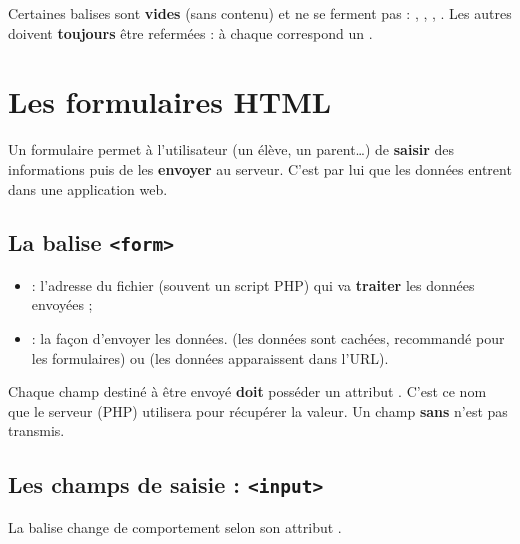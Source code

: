\begin{attention}
Certaines balises sont \textbf{vides} (sans contenu) et ne se ferment pas :
, , , . Les autres doivent
\textbf{toujours} être refermées : à chaque  correspond un .
\end{attention}

\section{Les formulaires HTML}

Un formulaire permet à l'utilisateur (un élève, un parent\dots) de \textbf{saisir}
des informations puis de les \textbf{envoyer} au serveur. C'est par lui que les
données entrent dans une application web.

\subsection{La balise \texttt{<form>}}

\begin{syntaxe}
\end{syntaxe}

\begin{itemize}
  \item {} : l'adresse du fichier (souvent un script PHP) qui va
        \textbf{traiter} les données envoyées ;
  \item {} : la façon d'envoyer les données.  (les données
        sont cachées, recommandé pour les formulaires) ou  (les données
        apparaissent dans l'URL).
\end{itemize}

\begin{attention}
Chaque champ destiné à être envoyé \textbf{doit} posséder un attribut .
C'est ce nom que le serveur (PHP) utilisera pour récupérer la valeur. Un champ
\textbf{sans}  n'est pas transmis.
\end{attention}

\subsection{Les champs de saisie : \texttt{<input>}}

La balise  change de comportement selon son attribut .

